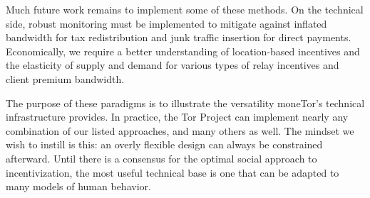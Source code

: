 Much future work remains to implement some of these methods.
On the technical side, robust monitoring must be implemented to mitigate against inflated bandwidth for tax redistribution and junk traffic insertion for direct payments.
Economically, we require a better understanding of location-based incentives and the elasticity of supply and demand for various types of relay incentives and client premium bandwidth.

The purpose of these paradigms is to illustrate the versatility moneTor's technical infrastructure provides.
In practice, the Tor Project can implement nearly any combination of our listed approaches, and many others as well.
The mindset we wish to instill is this: an overly flexible design can always be constrained afterward.
Until there is a consensus for the optimal social approach to incentivization, the most useful technical base is one that can be adapted to many models of human behavior.

